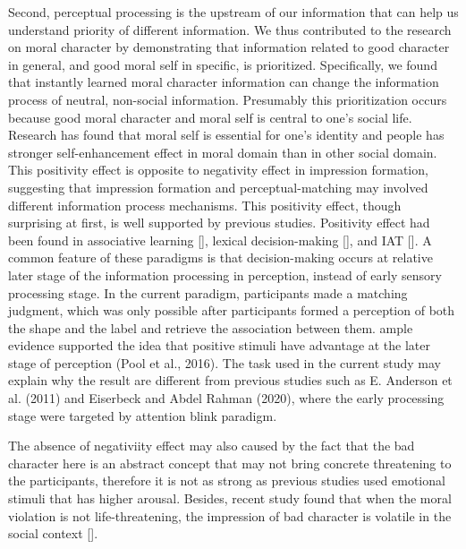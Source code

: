 \documentclass[
  man]{apa6}
\begin{document}
Second, perceptual processing is the upstream of our information that can help us understand priority of different information. We thus contributed to the research on moral character by demonstrating that information related to good character in general, and good moral self in specific, is prioritized. Specifically, we found that instantly learned moral character information can change the information process of neutral, non-social information. Presumably this prioritization occurs because good moral character and moral self is central to one's social life. Research has found that moral self is essential for one's identity and people has stronger self-enhancement effect in moral domain than in other social domain. This positivity effect is opposite to negativity effect in impression formation, suggesting that impression formation and perceptual-matching may involved different information process mechanisms. This positivity effect, though surprising at first, is well supported by previous studies. Positivity effect had been found in associative learning {[}{]}, lexical decision-making {[}{]}, and IAT {[}{]}. A common feature of these paradigms is that decision-making occurs at relative later stage of the information processing in perception, instead of early sensory processing stage. In the current paradigm, participants made a matching judgment, which was only possible after participants formed a perception of both the shape and the label and retrieve the association between them. ample evidence supported the idea that positive stimuli have advantage at the later stage of perception (Pool et al., 2016). The task used in the current study may explain why the result are different from previous studies such as E. Anderson et al. (2011) and Eiserbeck and Abdel Rahman (2020), where the early processing stage were targeted by attention blink paradigm.

The absence of negativiity effect may also caused by the fact that the bad character here is an abstract concept that may not bring concrete threatening to the participants, therefore it is not as strong as previous studies used emotional stimuli that has higher arousal. Besides, recent study found that when the moral violation is not life-threatening, the impression of bad character is volatile in the social context {[}{]}.
\end{document}
